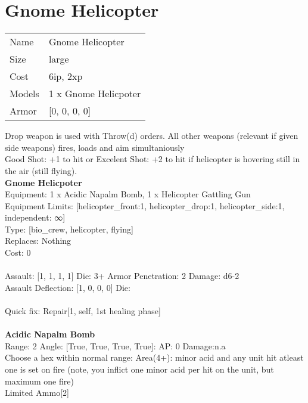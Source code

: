 \pagebreak

\section{ Gnome Helicopter }

\begin{tabular}{ll}
  Name & Gnome Helicopter \\
  Size & large\\
  Cost & 6ip, 2xp\\
  Models & 1 x Gnome Helicpoter\\
  Armor & [0, 0, 0, 0]\\
\end{tabular}

\noindent Drop weapon is used with Throw(d) orders. All other weapons (relevant if given side weapons) fires, loads and aim simultaniously\\ 
Good Shot: +1 to hit or Excelent Shot: +2 to hit if helicopter is hovering still in the air (still flying).\\ 


{\bf Gnome Helicpoter } \\
Equipment: 1 x Acidic Napalm Bomb, 1 x Helicopter Gattling Gun \\
Equipment Limits: [helicopter_front:1, helicopter_drop:1, helicopter_side:1, independent: ∞] \\
Type: [bio_crew, helicopter, flying] \\
Replaces: Nothing \\
Cost: 0\\
\ \\
Assault: [1, 1, 1, 1] Die: 3+ Armor Penetration: 2 Damage: d6-2 \\
Assault Deflection: [1, 0, 0, 0] Die: \\
\indent  
\ \\
Quick fix: Repair[1, self, 1st healing phase]\\ 

\ \\
{\bf Acidic Napalm Bomb } \\



Range: 2  Angle: [True, True, True, True]: AP: 0 Damage:n.a \\
Choose a hex within normal range: Area(4+): minor acid and any unit hit atleast one is set on fire (note, you inflict one minor acid per hit on the unit, but maximum one fire)\\ 
Limited Ammo[2]\\ 




